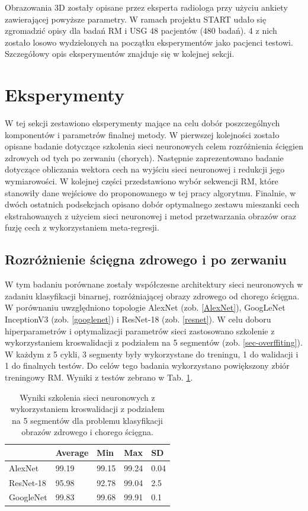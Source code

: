 Obrazowania 3D zostały opisane przez eksperta radiologa przy użyciu ankiety zawierającej powyższe parametry. W ramach projektu START udało się zgromadzić opisy dla badań RM i USG 48 pacjentów (480 badań). 4 z nich zostało losowo wydzielonych na początku eksperymentów jako pacjenci testowi. Szczegółowy opis eksperymentów znajduje się w kolejnej sekcji.

\section{Eksperymenty}

W tej sekcji zestawiono eksperymenty mające na celu dobór poszczególnych komponentów i parametrów finalnej metody. W pierwszej kolejności zostało opisane badanie dotyczące szkolenia sieci neuronowych celem rozróżnienia ścięgien zdrowych od tych po zerwaniu (chorych). Następnie zaprezentowano badanie dotyczące obliczania wektora cech na wyjściu sieci neuronowej i redukcji jego wymiarowości. W kolejnej części przedstawiono wybór sekwencji RM, które stanowiły dane wejściowe do proponowanego w tej pracy algorytmu. Finalnie, w dwóch ostatnich podsekcjach opisano dobór optymalnego zestawu mieszanki cech ekstrahowanych z użyciem sieci neuronowej i metod przetwarzania obrazów oraz fuzję cech z wykorzystaniem meta-regresji.  


\subsection{Rozróżnienie ścięgna zdrowego i po zerwaniu}

W tym badaniu porównane zostały współczesne architektury sieci neuronowych w zadaniu klasyfikacji binarnej, rozróżniającej obrazy zdrowego od chorego ścięgna. W porównaniu uwzględniono topologie AlexNet (zob. \ref{AlexNet}), GoogLeNet InceptionV3 (zob. \ref{googlenet}) i ResNet-18 (zob. \ref{resnet}). W celu doboru hiperparametrów i optymalizacji parametrów sieci zastosowano szkolenie z wykorzystaniem kroswalidacji z podziałem na 5 segmentów (zob. \ref{sec-overffiting}). W każdym z 5 cykli, 3 segmenty były wykorzystane do treningu, 1 do walidacji i 1 do finalnych testów. Do celów tego badania wykorzystano powiększony zbiór treningowy RM. Wyniki z testów zebrano w Tab. \ref{cross-validation}.
\begin{table}[h!]
	\setlength{\tabcolsep}{14pt}
	\centering
	\caption{Wyniki szkolenia sieci neuronowych z wykorzystaniem kroswalidacji z podziałem na 5 segmentów dla problemu klasyfikacji obrazów zdrowego i chorego ścięgna.}
	\label{cross-validation}
	\begin{tabular}{l | l | l | l | l }
		 & Average   & Min   & Max   & SD   \\ \hline \hline
		AlexNet   & 99.19 & 99.15 & 99.24 & 0.04 \\ \hline
		ResNet-18 & 95.98 & 92.78 & 99.04 & 2.5  \\ \hline
		GoogleNet & 99.83 & 99.68 & 99.91 & 0.1  \\ %
	\end{tabular}
\end{table}

